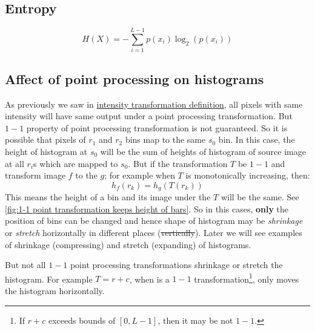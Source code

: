 \subsection{Entropy}

\[
    H(X) = -\sum\limits_{i=1}^{L-1}p(x_i)\log_2(p(x_i))
\]

\subsection{Affect of point processing on histograms}

As previously we saw in \hyperref[intensity transformation definition]{intensity
transformation definition}, all pixels with same intensity will have same output
under a point processing transformation. But $1-1$ property of point processing
transformation is not guaranteed. So it is possible that pixels of $r_1$ and
$r_2$ bins map to the same $s_0$ bin.  In this case, the height of histogram at
$s_0$ will be the sum of heights of histogram of source image at all $r_i$s
which are mapped to $s_0$. But if the transformation $T$ be $1-1$ and transform
image $f$ to the $g$; for example
when $T$ is monotonically increasing, then:
\[
    h_f(r_k) = h_g(T(r_k))
\]
This means the height of a bin and its image under the $T$ will be the same. See
\autoref{fig:1-1 point transformation keeps height of bars}. So in this cases,
\textbf{only} the position of bins can be changed and hence shape of histogram
may be \emph{shrinkage} or \emph{stretch} horizontally in different places
(\st{vertically}). Later we will see examples of shrinkage (compressing) and
stretch (expanding) of histograms.

But not all $1-1$ point processing transformations shrinkage or stretch the
histogram. For example $T = r + c$, when is a $1-1$ transformation\footnote{If
$r+c$ exceeds bounds of $[0,L-1]$, then it may be not $1-1$.}, only moves the
histogram horizontally. 


